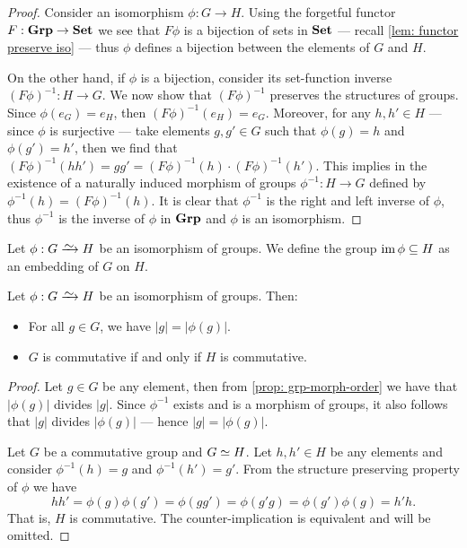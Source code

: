 \begin{proof}
Consider an isomorphism \(\phi: G \to H\). Using the forgetful functor \(F:
{\textbf{Grp}} \to {\textbf{Set}}\) we see that \(F\phi\) is a bijection of sets in \({\textbf{Set}}\) ---
recall \cref{lem: functor preserve iso} --- thus \(\phi\) defines a bijection
between the elements of \(G\) and \(H\).

On the other hand, if \(\phi\) is a bijection, consider its set-function
inverse \({(F\phi)}^{-1}: H \to G\). We now show that \({(F\phi)}^{-1}\) preserves
the structures of groups. Since \(\phi(e_G) = e_H\), then \({(F\phi)}^{-1}(e_H)
= e_G\). Moreover, for any \(h, h' \in H\) --- since \(\phi\) is surjective
--- take elements \(g, g' \in G\) such that \(\phi(g) = h\) and \(\phi(g') =
h'\), then we find that \({(F\phi)}^{-1}(hh') = g g' = {(F\phi)}^{-1}(h) \cdot
{(F\phi)}^{-1}(h')\). This implies in the existence of a naturally induced
morphism of groups \(\phi^{-1}: H \to G\) defined by \(\phi^{-1}(h) =
{(F\phi)}^{-1}(h)\). It is clear that \(\phi^{-1}\) is the right and left
inverse of \(\phi\), thus \(\phi^{-1}\) is the inverse of \(\phi\) in \({\textbf{Grp}}\)
and \(\phi\) is an isomorphism.
\end{proof}

\begin{definition}[Embedding]
\label{def:grp-embedding}
Let \(\phi: G \isoto H\) be an isomorphism of groups. We define the group \(\operatorname{im}
\phi \subseteq H\) as an embedding of \(G\) on \(H\).
\end{definition}

\begin{proposition}\label{prop: iso-order-com}
Let \(\phi: G \isoto H\) be an isomorphism of groups. Then:
\begin{itemize}
  \setlength\itemsep{0em}
  \item For all \(g \in G\), we have \(|g| = |\phi(g)|\).
  \item \(G\) is commutative if and only if \(H\) is commutative.
\end{itemize}
\end{proposition}

\begin{proof}
Let \(g \in G\) be any element, then from \cref{prop: grp-morph-order} we have
that \(|\phi(g)|\) divides \(|g|\). Since \(\phi^{-1}\) exists and is a
morphism of groups, it also follows that \(|g|\) divides \(|\phi(g)|\) ---
hence \(|g| = |\phi(g)|\).

Let \(G\) be a commutative group and \(G \simeq H\). Let \(h, h' \in H\) be any
elements and consider \(\phi^{-1}(h) = g\) and \(\phi^{-1}(h') = g'\). From
the structure preserving property of \(\phi\) we have
\[
  h h' = \phi(g) \phi(g') = \phi(gg') = \phi(g'g) = \phi(g')\phi(g) = h' h.
\]
That is, \(H\) is commutative. The counter-implication is equivalent and will
be omitted.
\end{proof}

